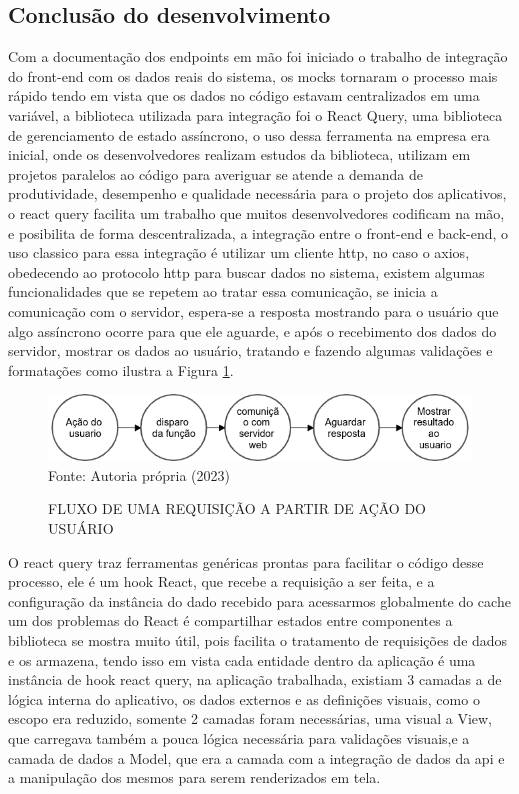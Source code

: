 \documentclass{ufersa}
\begin{document}
\subsection{Conclusão do desenvolvimento}
Com a documentação dos endpoints em mão foi iniciado o trabalho de integração do front-end com os dados reais do sistema, os mocks tornaram o processo mais rápido tendo em vista que os dados no código estavam centralizados em uma variável, a biblioteca utilizada para integração foi o React Query, uma biblioteca de gerenciamento de estado assíncrono, o uso dessa ferramenta na empresa era inicial, onde os desenvolvedores realizam estudos da biblioteca, utilizam em projetos paralelos ao código para averiguar se atende a demanda de produtividade, desempenho e qualidade necessária para o projeto dos aplicativos, o react query facilita um trabalho que muitos desenvolvedores codificam na mão, e posibilita de forma descentralizada, a integração entre o front-end e back-end, o uso classico para essa integração é utilizar um cliente http, no caso o axios, obedecendo ao protocolo http para buscar dados no sistema, existem algumas funcionalidades que se repetem ao tratar essa comunicação, se inicia a comunicação com o servidor, espera-se a resposta mostrando para o usuário que algo assíncrono ocorre para que ele aguarde, e após o recebimento dos dados do servidor, mostrar os dados ao usuário, tratando e fazendo algumas validações e formatações como ilustra a Figura \ref{fig:fluxoRequisicao}. 

\begin{figure}[!h]
\centering 
\caption{FLUXO DE UMA REQUISIÇÃO A PARTIR DE AÇÃO DO USUÁRIO }
\includegraphics[width=16cm]{assets/Fluxo de requisição.png} 
{\footnotesize Fonte: Autoria própria (2023)}
\label{fig:fluxoRequisicao}
\end{figure}


O react query traz ferramentas genéricas prontas para facilitar o código desse processo, ele é um hook React, que recebe a requisição a ser feita, e a configuração da instância do dado recebido para acessarmos globalmente do cache um dos problemas do React é compartilhar estados entre componentes a biblioteca se mostra muito útil, pois facilita o tratamento de requisições de dados e os armazena, tendo isso em vista cada entidade dentro da aplicação é uma instância de hook react query, na aplicação trabalhada, existiam 3 camadas a de lógica interna do aplicativo, os dados externos e as definições visuais, como o escopo era reduzido, somente 2 camadas foram necessárias, uma visual a View, que carregava também a pouca lógica necessária para validações visuais,e a camada de dados a Model, que era a camada com a integração de dados da api e a manipulação dos mesmos para serem renderizados em tela.
\end{document}

